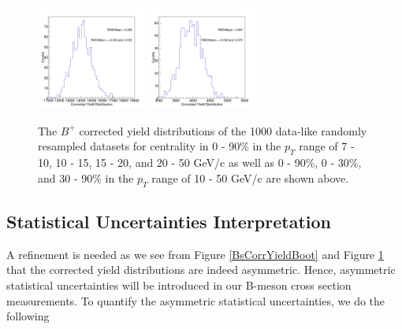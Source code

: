 \begin{figure}[h]
\begin{center}
\includegraphics[width= 0.32\textwidth]{Figures/Chapter5/BPCorrYield_0_30_10-50_Assym.png}
\includegraphics[width= 0.32\textwidth]{Figures/Chapter5/BPCorrYield_30_90_10-50_Assym.png}  
\caption{The $B^+$ corrected yield distributions of the 1000 data-like randomly resampled datasets for centrality in 0 - 90\% in the $p_T$ range of 7 - 10, 10 - 15, 15 - 20, and 20 - 50 GeV/c as well as 0 - 90\%, 0 - 30\%, and 30 - 90\% in the $p_T$ range of 10 - 50 GeV/c are shown above.} 
\label{BPCorrYieldBoot} 
\end{center}
\end{figure}

\clearpage

\subsection{Statistical Uncertainties Interpretation}

A refinement is needed as we see from Figure \ref{BsCorrYieldBoot} and Figure \ref{BPCorrYieldBoot} that the corrected yield distributions are indeed asymmetric. Hence, asymmetric statistical uncertainties will be introduced in our B-meson cross section measurements. To quantify the asymmetric statistical uncertainties, we do the following


